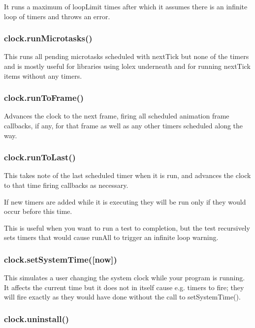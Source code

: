 It runs a maximum of {\ttfamily loop\+Limit} times after which it assumes there is an infinite loop of timers and throws an error.

\subsubsection*{{\ttfamily clock.\+run\+Microtasks()}}

This runs all pending microtasks scheduled with {\ttfamily next\+Tick} but none of the timers and is mostly useful for libraries using lolex underneath and for running {\ttfamily next\+Tick} items without any timers.

\subsubsection*{{\ttfamily clock.\+run\+To\+Frame()}}

Advances the clock to the next frame, firing all scheduled animation frame callbacks, if any, for that frame as well as any other timers scheduled along the way.

\subsubsection*{{\ttfamily clock.\+run\+To\+Last()}}

This takes note of the last scheduled timer when it is run, and advances the clock to that time firing callbacks as necessary.

If new timers are added while it is executing they will be run only if they would occur before this time.

This is useful when you want to run a test to completion, but the test recursively sets timers that would cause {\ttfamily run\+All} to trigger an infinite loop warning.

\subsubsection*{{\ttfamily clock.\+set\+System\+Time(\mbox{[}now\mbox{]})}}

This simulates a user changing the system clock while your program is running. It affects the current time but it does not in itself cause e.\+g. timers to fire; they will fire exactly as they would have done without the call to set\+System\+Time().

\subsubsection*{{\ttfamily clock.\+uninstall()}}

